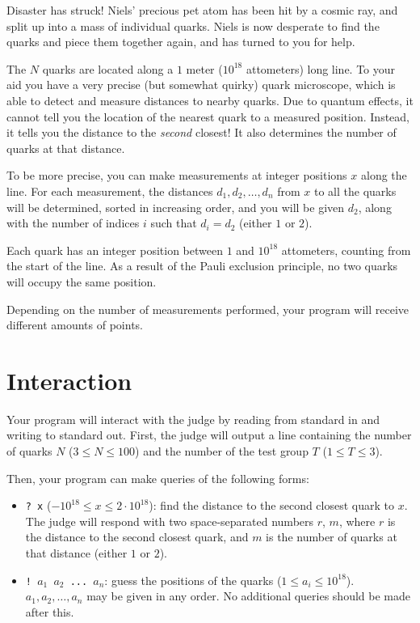 Disaster has struck!
Niels' precious pet atom has been hit by a cosmic ray, and split up into a mass of individual quarks.
Niels is now desperate to find the quarks and piece them together again, and has turned to you for help.

The $N$ quarks are located along a $1$ meter ($10^{18}$ attometers) long line.
To your aid you have a very precise (but somewhat quirky) quark microscope, which is able to detect and measure distances to nearby quarks.
Due to quantum effects, it cannot tell you the location of the nearest quark to a measured position.
Instead, it tells you the distance to the \emph{second} closest!
It also determines the number of quarks at that distance.

To be more precise, you can make measurements at integer positions $x$ along the line.
For each measurement, the distances $d_1, d_2, \ldots, d_n$ from $x$ to all the quarks will be determined, sorted in increasing order,
and you will be given $d_2$, along with the number of indices $i$ such that $d_i = d_2$ (either $1$ or $2$).

Each quark has an integer position between $1$ and $10^{18}$ attometers, counting from the start of the line.
As a result of the Pauli exclusion principle, no two quarks will occupy the same position.

Depending on the number of measurements performed, your program will receive different amounts of points.

\section*{Interaction}
Your program will interact with the judge by reading from standard in and writing to standard out.
First, the judge will output a line containing the number of quarks $N$ ($3 \le N \le 100$) and the number of the test group $T$ ($1 \le T \le 3$).

Then, your program can make queries of the following forms:

\begin{itemize}
  \item \texttt{? x} ($-10^{18} \le x \le 2\cdot 10^{18}$): find the distance to the second closest quark to $x$.
    The judge will respond with two space-separated numbers $r$, $m$,
    where $r$ is the distance to the second closest quark, and $m$ is the number of quarks at that distance (either $1$ or $2$).
  \item \texttt{! $a_1$ $a_2$ ... $a_n$}: guess the positions of the quarks ($1 \le a_i \le 10^{18}$).
    $a_1, a_2, \ldots, a_n$ may be given in any order.
    No additional queries should be made after this.
\end{itemize}

